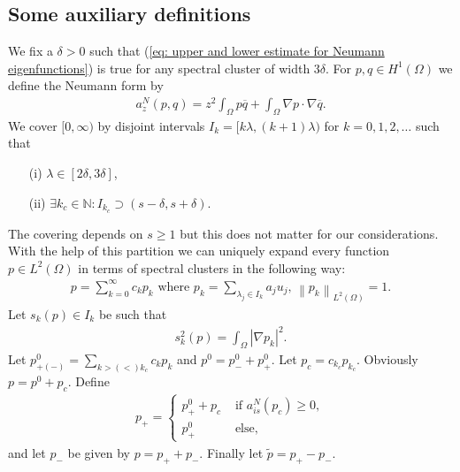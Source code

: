 \documentclass{amsart}
\newcommand{\abs}[1]{\left|#1\right|}
\newcommand{\norm}[1]{\left\| #1 \right\|}
\newcommand{\ptilde}{\tilde{p}}
\newcommand{\N}{\mathbb{N}}
\begin{document}
\subsection{Some auxiliary definitions}\label{sec: Some auxiliary definitions}
We fix a $\delta>0$ such that (\ref{eq: upper and lower estimate for Neumann eigenfunctions}) is true for any spectral cluster of width $3\delta$. For $p,q\in H^1(\Omega)$ we define the Neumann form by
\begin{align*}
 a_z^N(p,q) = z^2\int_{\Omega} p\overline{q} + \int_{\Omega} \nabla p\cdot \nabla \overline{q} .
\end{align*}
We cover $[0,\infty)$ by disjoint intervals $I_k=[k\lambda, (k+1)\lambda)$ for $k=0,1,2,\ldots$ such that
\begin{enumerate}
 \item [(i)] $\lambda \in [2\delta, 3\delta]$,
 \item [(ii)] $\exists k_c\in\N: I_{k_c} \supset (s-\delta, s+\delta)$.
\end{enumerate}
The covering depends on $s\geq1$ but this does not matter for our considerations. With the help of this partition we can uniquely expand every function $p\in L^2(\Omega)$ in terms of spectral clusters in the following way:
\begin{align*}
 p = \sum_{k=0}^{\infty} c_k p_k \text{ where }
 p_k = \sum_{\lambda_j\in I_k} a_j u_j, \, \norm{p_k}_{L^2(\Omega)}=1 .
\end{align*}
Let $s_k(p)\in I_k$ be such that
\begin{align*}
 s_k^2(p) = \int_{\Omega} \abs{\nabla p_k}^2.
\end{align*}
Let $p^0_{+(-)}=\sum_{k>(<)k_c} c_k p_k$ and $p^0=p^0_- + p^0_+$. Let $p_c=c_{k_c}p_{k_c}$. Obviously $p=p^0+p_c$. Define 
\begin{align*}
 p_+ =
  \begin{cases}
   p_+^0 + p_c & \text{ if } a_{is}^N(p_c)\geq0 , \\
   p_+^0 & \text{ else} ,
  \end{cases}
\end{align*}
and let $p_-$ be given by $p=p_+ + p_-$. Finally let $\ptilde=p_+-p_-$.
\end{document}
